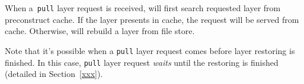When a~\texttt{pull} layer request is received, 
\sysname will first search requested layer from preconstruct cache.
If the layer presents in cache, the request will be served from cache.
Otherwise,
\sysname will rebuild a layer from file store.

Note that it's possible when a \texttt{pull} layer request comes 
before layer restoring is finished.
In this case, \texttt{pull} layer request \emph{waits} until the restoring is finished
(detailed in Section~\ref{xxx}).
 



%

